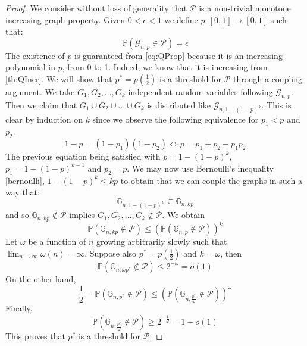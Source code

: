 \begin{proof}
	We consider without loss of generality that $\mathcal{P}$ is a non-trivial monotone increasing graph property.
	Given $0 < \epsilon < 1$ we define $p:[0,1] \to [0,1]$ such that:
	\begin{equation}
		\mathbb{P}(\mathcal{G}_{n, p} \in \mathcal{P}) = \epsilon
	\end{equation}
	The existence of $p$ is guaranteed from \eqref{eq:QProp} because it is an increasing polynomial in $p$, from 0 to 1.
	Indeed, we know that it is increasing from \eqref{th:QIncr}.
	\newline
	We will show that $p^* = p(\frac{1}{2})$ is a threshold for $\mathcal{P}$ through a coupling argument.
	We take $G_1, G_2, ..., G_k$ independent random variables following $\mathcal{G}_{n,p}$.
	Then we claim that $G_1 \cup G_2 \cup ... \cup G_k$ is distributed like $\mathcal{G}_{n, 1 - (1-p)^k}$.
	This is clear by induction on $k$ since we observe the following equivalence for $p_1 < p$ and $p_2$.
	\begin{equation}
		1 - p = (1 - p_1)(1-p_2) \iff p = p_1 + p_2 - p_1p_2
	\end{equation}
	The previous equation being satisfied with $p = 1 -(1-p)^k$, $p_1 = 1 - (1-p)^{k-1}$ and $p_2 = p$.
	\newline
	We may now use Bernoulli's inequality \eqref{bernoulli}, $1 - (1-p)^k \leq kp$ to obtain that we can couple the graphs in such a way that:
	\begin{equation}
		\mathbb{G}_{n,1 - (1-p)^k} \subseteq \mathbb{G}_{n, kp}
	\end{equation}
	and so $\mathbb{G}_{n, kp} \not\in \mathcal{P}$ implies $G_1, G_2, ..., G_k \not\in \mathcal{P}$. 
	We obtain
	\begin{equation}
		\mathbb{P}(\mathbb{G}_{n, kp} \not\in \mathcal{P}) \leq (\mathbb{P}(\mathbb{G}_{n,p}\not\in\mathcal{P}))^k
	\end{equation}
	Let $\omega$ be a function of $n$ growing arbitrarily slowly such that $\lim_{n\to\infty}\omega(n) = \infty$. 
	Suppose also $p^* = p(\frac{1}{2})$ and $k=\omega$, then
	\begin{equation}
		\mathbb{P}(\mathbb{G}_{n, \omega p^*} \not\in \mathcal{P}) \leq 2^{-\omega} = o(1)
	\end{equation}
	On the other hand,
	\begin{equation}
		\frac{1}{2} = \mathbb{P}(\mathbb{G}_{n,p^*} \not\in \mathcal{P}) \leq (\mathbb{P}(\mathbb{G}_{n, \frac{p^*}{\omega}} \not\in \mathcal{P}))^{\omega}
	\end{equation}
	Finally, 
	\begin{equation}
		\mathbb{P}(\mathbb{G}_{n, \frac{p^*}{\omega}} \not \in \mathcal{P}) \geq 2^{-\frac{1}{\omega}} = 1 -o(1)
	\end{equation}
	This proves that $p^*$ is a threshold for $\mathcal{P}$.
\end{proof}

